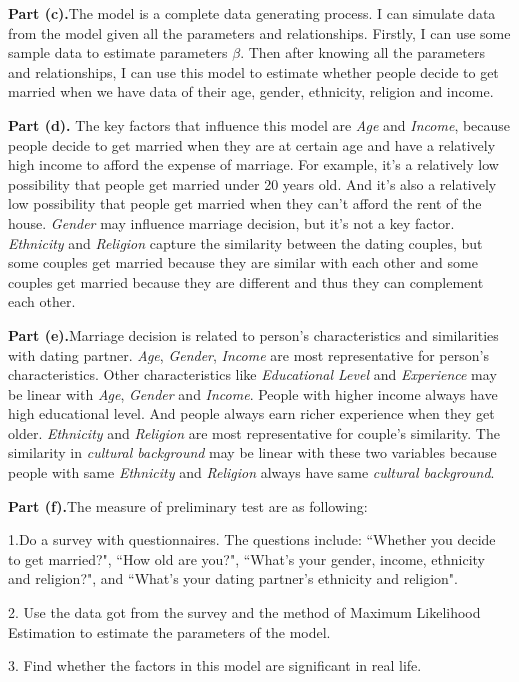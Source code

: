\documentclass[letterpaper,12pt]{article}
\theoremstyle{definition}
\begin{document}
\textbf{Part (c).}The model is a complete data generating process. I can simulate data from the model given all the parameters and relationships. Firstly, I can use some sample data to estimate parameters $\beta$. Then after knowing all the parameters and relationships, I can use this model to estimate whether people decide to get married when we have data of their age, gender, ethnicity, religion and income.

\textbf{Part (d).} The key factors that influence this model are \emph{Age} and \emph{Income}, because people decide to get married when they are at certain age and have a relatively high income to afford the expense of marriage. For example, it's a relatively low possibility that people get married under 20 years old. And it's also a relatively low possibility that people get married when they can't afford the rent of the house. \emph{Gender} may influence marriage decision, but it's not a key factor. \emph{Ethnicity} and \emph{Religion} capture the similarity between the dating couples, but some couples get married because they are similar with each other and some couples get married because they are different and thus they can complement each other.

\textbf{Part (e).}Marriage decision is related to person's characteristics and similarities with dating partner. \emph{Age}, \emph{Gender}, \emph{Income} are most representative for person's characteristics. Other characteristics like \emph{Educational Level} and \emph{Experience}  may be linear with \emph{Age}, \emph{Gender} and \emph{Income}. People with higher income always have high educational level. And people always earn richer experience when they get older. \emph{Ethnicity} and \emph{Religion} are most representative for couple's similarity. The similarity in \emph{cultural background} may be linear with these two variables because people with same \emph{Ethnicity} and \emph{Religion} always have same \emph{cultural background}. 

\textbf{Part (f).}The measure  of preliminary test are as following:

 1.Do a survey with questionnaires. The questions include: ``Whether you decide to get married?", ``How old are you?", ``What's your gender, income, ethnicity and religion?", and ``What's your dating partner's ethnicity and religion".
 
2. Use the data got from the survey and the method of Maximum Likelihood Estimation to estimate the parameters of the model.

3. Find whether the factors in this model are significant in real life. 
\end{document}
